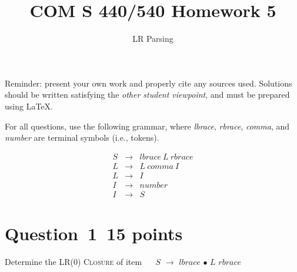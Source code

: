 \documentclass[10pt]{article}
\title{COM S 440/540 Homework 5}
\date{}
\author{LR Parsing}
\begin{document}
\maketitle

\noindent
Reminder: present your own work and properly cite any sources used.
Solutions should be written satisfying the \emph{other student viewpoint},
and must be prepared using \LaTeX.
\renewcommand{\thepage}{~}
 
 
For all questions, use the following grammar, where
\emph{lbrace}, \emph{rbrace}, \emph{comma}, and \emph{number}
are terminal symbols (i.e., tokens).

\begin{eqnarray}
  S & \rightarrow & \mathit{lbrace} ~L~ \mathit{rbrace}
\\
  L & \rightarrow & L ~\mathit{comma}~ I
\\
  L & \rightarrow & I
\\
  I & \rightarrow & \mathit{number}
\\
  I & \rightarrow & S
\end{eqnarray}


\section*{Question~1~\hfill 15 points}

Determine the LR(0) \textsc{Closure} of item ~~
$S$ $\rightarrow$ $\mathit{lbrace}$ $\bullet$ $L$ $\mathit{rbrace}$
\end{document}
